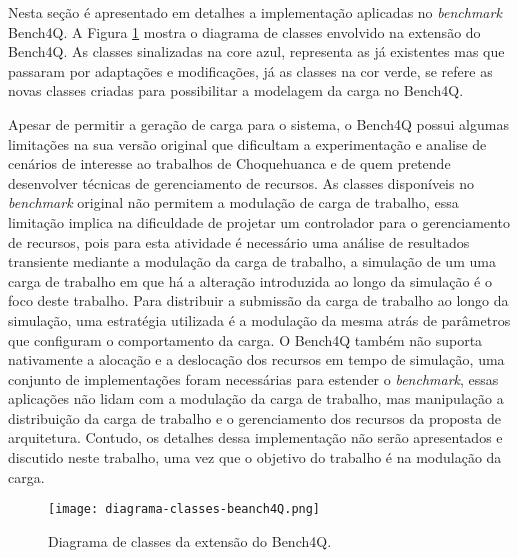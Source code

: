 Nesta seção é apresentado em detalhes a implementação aplicadas no \textit{benchmark} Bench4Q. A Figura \ref{fig:diagrama-classes} mostra o diagrama de classes envolvido na extensão do Bench4Q. As classes sinalizadas na core azul, representa as já existentes mas que passaram por adaptações e modificações, já as classes na cor verde, se refere as novas classes criadas para possibilitar a modelagem da carga no Bench4Q.

Apesar de permitir a geração de carga para o sistema, o Bench4Q possui algumas limitações na sua versão original que dificultam a experimentação e analise de cenários de interesse ao trabalhos de Choquehuanca e \cite{Lourenco2015} de quem pretende desenvolver técnicas de gerenciamento de recursos.
As classes disponíveis no \textit{benchmark} original não permitem a modulação de carga de trabalho, essa limitação implica na dificuldade de projetar um controlador para o gerenciamento de recursos, pois para esta atividade é necessário uma análise de resultados transiente mediante a modulação da carga de trabalho, a simulação de um uma carga de trabalho em que há a alteração introduzida ao longo da simulação é o foco deste trabalho.
Para distribuir a submissão da carga de trabalho ao longo da simulação, uma estratégia utilizada é a modulação da mesma atrás de parâmetros que configuram o comportamento da carga. O Bench4Q também não suporta nativamente a alocação e a deslocação dos recursos em tempo de simulação, uma conjunto de implementações foram necessárias para estender o \textit{benchmark}, essas aplicações não lidam com a modulação da carga de trabalho, mas manipulação a distribuição da carga de trabalho e o gerenciamento dos recursos da proposta de arquitetura. Contudo, os detalhes dessa implementação não serão apresentados e discutido neste trabalho, uma vez que o objetivo do trabalho é na modulação da carga.

\begin{figure}[htb]
	\centering
	\texttt{[image: diagrama-classes-beanch4Q.png]}	
	\caption{Diagrama de classes da extensão do Bench4Q.}
	\label{fig:diagrama-classes}
	\fautor
\end{figure}


